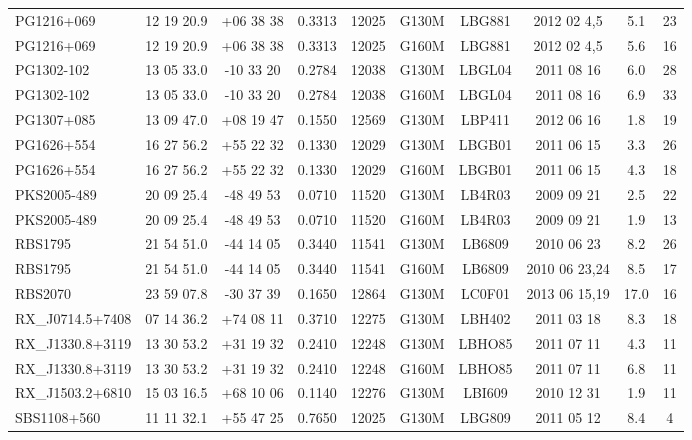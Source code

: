 \documentclass[iop]{emulateapj-rtx4}
\begin{document}
\begin{table}[ht]
\begin{center}
\begin{tabular}{l c c c c c c c c c}
 PG1216+069				& 12 19 20.9  &  +06 38 38  &  0.3313  & 12025 & G130M     & LBG881  & 2012 02 4,5  &    5.1 &  23  \\
 PG1216+069				& 12 19 20.9  &  +06 38 38  &  0.3313  & 12025 & G160M     & LBG881  & 2012 02 4,5  &    5.6 &  16  \\
 PG1302-102 				& 13 05 33.0  &  -10 33 20   &  0.2784  & 12038 & G130M     & LBGL04  & 2011 08 16  &     6.0 &  28  \\
 PG1302-102 				& 13 05 33.0  &  -10 33 20   &  0.2784  & 12038 & G160M     & LBGL04  & 2011 08 16  &     6.9 &  33  \\
 PG1307+085 				& 13 09 47.0  &  +08 19 47  &  0.1550 & 12569 & G130M      & LBP411   & 2012 06 16  &     1.8 &  19  \\
 PG1626+554 				& 16 27 56.2  &  +55 22 32  &  0.1330 & 12029  & G130M     & LBGB01  & 2011 06 15  &     3.3 &  26  \\
 PG1626+554 				& 16 27 56.2  &  +55 22 32  &  0.1330 & 12029  & G160M     & LBGB01  & 2011 06 15  &     4.3 &  18  \\
 PKS2005-489 				& 20 09 25.4  &  -48 49 53   &  0.0710 & 11520 & G130M      & LB4R03   & 2009 09 21  &     2.5 &  22  \\
 PKS2005-489 				& 20 09 25.4  &  -48 49 53   &  0.0710 & 11520 & G160M      & LB4R03   & 2009 09 21  &     1.9 &  13  \\
 RBS1795 				& 21 54 51.0  &  -44 14 05   &  0.3440 & 11541 & G130M      & LB6809   & 2010 06 23  &     8.2 &  26  \\
 RBS1795 				& 21 54 51.0  &  -44 14 05   &  0.3440 & 11541 & G160M      & LB6809   & 2010 06 23,24  &     8.5 &  17  \\
 RBS2070 				& 23 59 07.8  &  -30 37 39   &  0.1650 & 12864  & G130M     & LC0F01   & 2013 06 15,19  &   17.0 &  16  \\
 RX\_J0714.5+7408 			& 07 14 36.2  &  +74 08 11  &  0.3710 & 12275  & G130M     & LBH402   & 2011 03 18   &     8.3 &  18  \\
 RX\_J1330.8+3119 			& 13 30 53.2  &  +31 19 32  &  0.2410 & 12248	 & G130M     & LBHO85  & 2011 07 11    &    4.3 &  11  \\
 RX\_J1330.8+3119 			& 13 30 53.2  &  +31 19 32  &  0.2410 & 12248	 & G160M     & LBHO85  & 2011 07 11    &    6.8 &  11  \\
 RX\_J1503.2+6810 	 		& 15 03 16.5  &  +68 10 06  &  0.1140  & 12276 & G130M     & LBI609    & 2010 12 31 &      1.9 &  11  \\
 SBS1108+560 			         & 11 11 32.1  &  +55 47 25  &  0.7650  & 12025 & G130M     & LBG809  & 2011 05 12   &     8.4 & 4  \\

\end{tabular}
\end{center}
\end{table}
\end{document}
